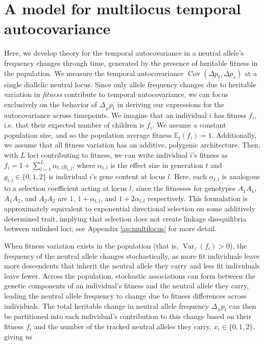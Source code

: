 \documentclass[11pt]{article}
\newcommand{\E}{\mathbb{E}}
\DeclareMathOperator{\var}{Var}
\DeclareMathOperator{\cov}{Cov}
\begin{document}
\section{A model for multilocus temporal autocovariance}

Here, we develop theory for the temporal autocovariance in a neutral allele's
frequency changes through time, generated by the presence of heritable fitness
in the population. We measure the temporal autocovariance $\cov(\Delta p_t,
\Delta p_s)$ at a single diallelic neutral locus. Since only allele frequency
changes due to heritable variation in \emph{fitness} contribute to temporal
autocovariance, we can focus exclusively on the behavior of $\Delta_{_H} p_t$
in deriving our expressions for the autocovariance across timepoints. We
imagine that an individual $i$ has fitness $f_i$, i.e. that their expected
number of children is $f_i$. We assume a constant population size, and so the
population average fitness $\E_i(f_i) = 1$. Additionally, we assume that all
fitness variation has an additive, polygenic architecture. Then, with $L$ loci
contributing to fitness, we can write individual $i$'s fitness as $f_i = 1 +
\sum_{l=1}^L \alpha_{t,l} g_{i,l}$, where $\alpha_{t,l}$ is the effect size in
generation $t$ and $g_{i,l} \in \{0, 1, 2\}$ is individual $i$'s gene content
at locus $l$. Here, each $\alpha_{t,l}$ is analogous to a selection
coefficient acting at locus $l$, since the fitnesses for genotypes $A_1 A_1$,
$A_1 A_2$, and $A_2 A_2$ are $1$, $1 + \alpha_{t,l}$, and $1 + 2\alpha_{t,l}$
respectively. This formulation is approximately equivalent to exponential
directional selection on some additively determined trait, implying that
selection does not create linkage disequilibria between unlinked loci; see
Appendix \ref{ap:multilocus} for more detail.

When fitness variation exists in the population (that is, $\var_i(f_i) > 0$),
the frequency of the neutral allele changes stochastically, as more fit
individuals leave more descendents that inherit the neutral allele they carry
and less fit individuals leave fewer. Across the population, stochastic
associations can form between the genetic components of an individual's fitness
and the neutral allele they carry, leading the neutral allele frequency to
change due to fitness differences across individuals. The total heritable
change in neutral allele frequency $\Delta_{_H} p_t$ can then be partitioned
into each individual's contribution to this change based on their fitness $f_i$
and the number of the tracked neutral alleles they carry, $x_i \in \{0, 1,
2\}$, giving us
\end{document}
